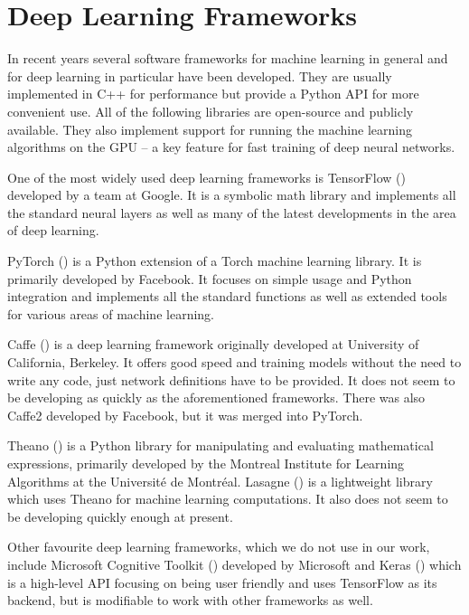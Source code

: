 \section{Deep Learning Frameworks}
In recent years several software frameworks for machine learning in general and for deep learning in particular have been developed. They are usually implemented in C++ for performance but provide a Python API for more convenient use. All of the following libraries are open-source and publicly available. They also implement support for running the machine learning algorithms on the GPU -- a key feature for fast training of deep neural networks. \par
One of the most widely used deep learning frameworks is TensorFlow (\cite{martin_abadi_tensorflow:_2015}) developed by a team at Google. It is a symbolic math library and implements all the standard neural layers as well as many of the latest developments in the area of deep learning.  \par
PyTorch (\cite{paszke_automatic_2017}) is a Python extension of a Torch machine learning library. It is primarily developed by Facebook. It focuses on simple usage and Python integration and implements all the standard functions as well as extended tools for various areas of machine learning. \par
Caffe (\cite{jia_caffe:_2014}) is a deep learning framework originally developed at University of California, Berkeley. It offers good speed and training models without the need to write any code, just network definitions have to be provided. It does not seem to be developing as quickly as the aforementioned frameworks. There was also Caffe2 developed by Facebook, but it was merged into PyTorch. \par
Theano (\cite{theano_development_team_theano:_2016}) is a Python library for manipulating and evaluating mathematical expressions, primarily developed by the Montreal Institute for Learning Algorithms at the Université de Montréal. Lasagne (\cite{dieleman_lasagne:_2015}) is a lightweight library which uses Theano for machine learning computations. It also does not seem to be developing quickly enough at present. \par
Other favourite deep learning frameworks, which we do not use in our work, include Microsoft Cognitive Toolkit (\cite{seide_cntk:_2016}) developed by Microsoft and Keras (\cite{chollet_keras_2015}) which is a high-level API focusing on being user friendly and uses TensorFlow as its backend, but is modifiable to work with other frameworks as well.

